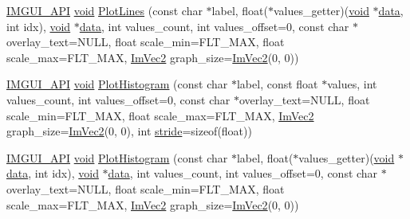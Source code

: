 \begin{DoxyCompactItemize}
\item 
\hyperlink{imgui_8h_a43829975e84e45d1149597467a14bbf5}{I\+M\+G\+U\+I\+\_\+\+A\+PI} \hyperlink{imgui__impl__opengl3__loader_8h_ac668e7cffd9e2e9cfee428b9b2f34fa7}{void} \hyperlink{namespaceImGui_a94a2645d45c96da35b834dc7db93a9f1}{Plot\+Lines} (const char $\ast$label, float($\ast$values\+\_\+getter)(\hyperlink{imgui__impl__opengl3__loader_8h_ac668e7cffd9e2e9cfee428b9b2f34fa7}{void} $\ast$\hyperlink{imgui__impl__opengl3__loader_8h_abd87654504355b4c1bb002dcb1d4d16a}{data}, int idx), \hyperlink{imgui__impl__opengl3__loader_8h_ac668e7cffd9e2e9cfee428b9b2f34fa7}{void} $\ast$\hyperlink{imgui__impl__opengl3__loader_8h_abd87654504355b4c1bb002dcb1d4d16a}{data}, int values\+\_\+count, int values\+\_\+offset=0, const char $\ast$overlay\+\_\+text=N\+U\+LL, float scale\+\_\+min=F\+L\+T\+\_\+\+M\+AX, float scale\+\_\+max=F\+L\+T\+\_\+\+M\+AX, \hyperlink{structImVec2}{Im\+Vec2} graph\+\_\+size=\hyperlink{structImVec2}{Im\+Vec2}(0, 0))
\item 
\hyperlink{imgui_8h_a43829975e84e45d1149597467a14bbf5}{I\+M\+G\+U\+I\+\_\+\+A\+PI} \hyperlink{imgui__impl__opengl3__loader_8h_ac668e7cffd9e2e9cfee428b9b2f34fa7}{void} \hyperlink{namespaceImGui_af7a92b2118981835b5251bfdaac50252}{Plot\+Histogram} (const char $\ast$label, const float $\ast$values, int values\+\_\+count, int values\+\_\+offset=0, const char $\ast$overlay\+\_\+text=N\+U\+LL, float scale\+\_\+min=F\+L\+T\+\_\+\+M\+AX, float scale\+\_\+max=F\+L\+T\+\_\+\+M\+AX, \hyperlink{structImVec2}{Im\+Vec2} graph\+\_\+size=\hyperlink{structImVec2}{Im\+Vec2}(0, 0), int \hyperlink{imgui__impl__opengl3__loader_8h_adec60f1216ca1b900f8d776c5b6190e0}{stride}=sizeof(float))
\item 
\hyperlink{imgui_8h_a43829975e84e45d1149597467a14bbf5}{I\+M\+G\+U\+I\+\_\+\+A\+PI} \hyperlink{imgui__impl__opengl3__loader_8h_ac668e7cffd9e2e9cfee428b9b2f34fa7}{void} \hyperlink{namespaceImGui_af8089203baf8cf723a158c9e34bda2a4}{Plot\+Histogram} (const char $\ast$label, float($\ast$values\+\_\+getter)(\hyperlink{imgui__impl__opengl3__loader_8h_ac668e7cffd9e2e9cfee428b9b2f34fa7}{void} $\ast$\hyperlink{imgui__impl__opengl3__loader_8h_abd87654504355b4c1bb002dcb1d4d16a}{data}, int idx), \hyperlink{imgui__impl__opengl3__loader_8h_ac668e7cffd9e2e9cfee428b9b2f34fa7}{void} $\ast$\hyperlink{imgui__impl__opengl3__loader_8h_abd87654504355b4c1bb002dcb1d4d16a}{data}, int values\+\_\+count, int values\+\_\+offset=0, const char $\ast$overlay\+\_\+text=N\+U\+LL, float scale\+\_\+min=F\+L\+T\+\_\+\+M\+AX, float scale\+\_\+max=F\+L\+T\+\_\+\+M\+AX, \hyperlink{structImVec2}{Im\+Vec2} graph\+\_\+size=\hyperlink{structImVec2}{Im\+Vec2}(0, 0))

\end{DoxyCompactItemize}
